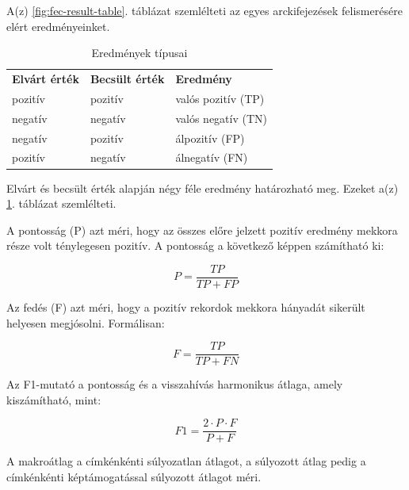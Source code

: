\documentclass[12pt,a4]{article}
\begin{document}
            A(z) \ref{fig:fec-result-table}. táblázat szemlélteti az egyes arckifejezések felismerésére elért eredményeinket.
            
            \begin{table}[htb] 
                
                \begin{tabular}{lll}
                \textbf{Elvárt érték} & \textbf{Becsült érték} & \textbf{Eredmény}      \\
                pozitív      & pozitív       & valós pozitív (TP) \\
                negatív      & negatív       & valós negatív (TN) \\
                negatív      & pozitív       & álpozitív (FP)     \\
                pozitív      & negatív       & álnegatív (FN)    
                \end{tabular}
                \caption{Eredmények típusai}
                \label{fig:cf-result-types}
            \end{table}

            
            Elvárt és becsült érték alapján négy féle eredmény határozható meg. Ezeket a(z) \ref{fig:cf-result-types}. táblázat szemlélteti. 
            
            A pontosság (P) azt méri, hogy az összes előre jelzett pozitív eredmény mekkora része volt ténylegesen pozitív. A pontosság a következő képpen számítható ki:

            \begin{equation}
                P = \frac{TP}{TP + FP}
            \end{equation}
            
            Az fedés (F) azt méri, hogy a pozitív rekordok mekkora hányadát sikerült helyesen megjósolni. Formálisan:

            \begin{equation}
                F = \frac{TP}{TP + FN}
            \end{equation}
            
            Az F1-mutató a pontosság és a visszahívás harmonikus átlaga, amely kiszámítható, mint:

            \begin{equation}
                F1 = \frac{2 \cdot P \cdot F}{P + F}
            \end{equation}
            
            A makroátlag a címkénkénti súlyozatlan átlagot, a súlyozott átlag pedig a címkénkénti képtámogatással súlyozott átlagot méri.            
        
\end{document}
